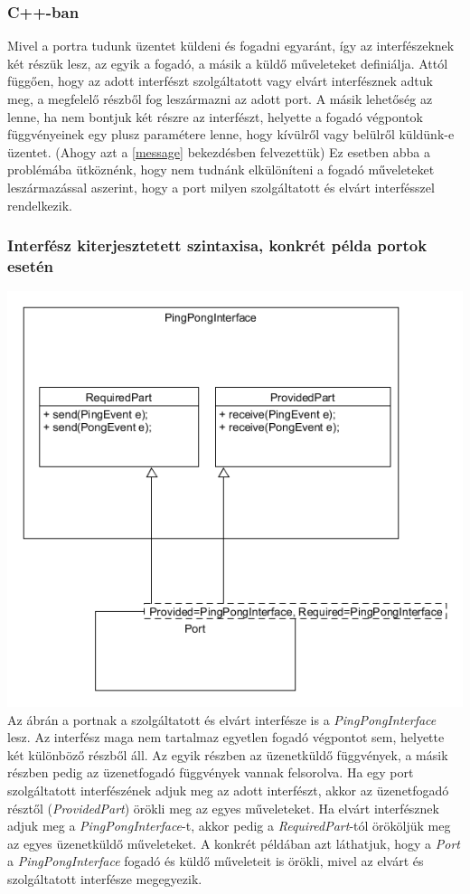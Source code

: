 \documentclass[a4paper,12pt]{report}
\begin{document}
\subsubsection{C++-ban}
Mivel a portra tudunk üzentet küldeni és fogadni egyaránt, így az interfészeknek két részük lesz, az egyik a fogadó, a másik a küldő műveleteket definiálja. Attól függően, hogy az adott interfészt szolgáltatott vagy elvárt interfésznek adtuk meg, a megfelelő részből fog leszármazni az adott port. A másik lehetőség az lenne, ha nem bontjuk két részre az interfészt, helyette a fogadó végpontok függvényeinek egy plusz paramétere lenne, hogy kívülről vagy belülről küldünk-e üzentet. (Ahogy azt a \ref{message} bekezdésben felvezettük) Ez esetben abba a problémába ütköznénk, hogy nem tudnánk elkülöníteni a fogadó műveleteket leszármazással aszerint, hogy a port milyen szolgáltatott és elvárt interfésszel rendelkezik. \\

\subsubsection{Interfész kiterjesztetett szintaxisa, konkrét példa portok esetén}
\includegraphics[scale=0.7]{seperate_inf.png} \\
Az ábrán a portnak a szolgáltatott és elvárt interfésze is a \textit{PingPongInterface} lesz. Az interfész maga nem tartalmaz egyetlen fogadó végpontot sem, helyette két különböző részből áll. Az egyik részben az üzenetküldő függvények, a másik részben pedig az üzenetfogadó függvények vannak felsorolva. Ha egy port szolgáltatott interfészének adjuk meg az adott interfészt, akkor az üzenetfogadó résztől (\textit{ProvidedPart}) örökli meg az egyes műveleteket. Ha elvárt interfésznek adjuk meg a \textit{PingPongInterface}-t, akkor pedig a \textit{RequiredPart}-tól örököljük meg az egyes üzenetküldő műveleteket. A konkrét példában azt láthatjuk, hogy a \textit{Port} a \textit{PingPongInterface} fogadó és küldő műveleteit is örökli, mivel az elvárt és szolgáltatott interfésze megegyezik.
\end{document}

